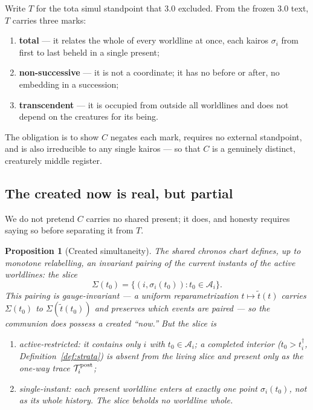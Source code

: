 \documentclass[11pt,a4paper]{article}
\def\textit#1{#1}%
\def\emph#1{#1}%
\theoremstyle{definition}
\theoremstyle{plain}
\newtheorem{proposition}[definition]{Proposition}
\theoremstyle{remark}
\begin{document}
Write \(T\) for the \textit{tota simul} standpoint that 3.0 excluded. From the frozen 3.0
text, \(T\) carries three marks:
\begin{enumerate}[label=\textup{(T\arabic*)},leftmargin=1.25cm]
\item \textbf{total} --- it relates the \emph{whole} of every worldline at once, each
kairos \(\sigma_i\) from first to last beheld in a single present;
\item \textbf{non-successive} --- it is not a coordinate; it has no before or after, no
embedding in a succession;
\item \textbf{transcendent} --- it is occupied from outside all worldlines and does not
depend on the creatures for its being.
\end{enumerate}
The obligation is to show \(C\) negates each mark, requires no external standpoint, and
is also irreducible to any single kairos --- so that \(C\) is a genuinely distinct,
creaturely middle register.

\subsection{The created now is real, but partial}

We do not pretend \(C\) carries no shared present; it does, and honesty requires saying
so before separating it from \(T\).

\begin{proposition}[Created simultaneity]\label{prop:now}
The shared chronos chart defines, up to monotone relabelling, an invariant pairing of
the \emph{current} instants of the active worldlines: the slice
\[
\Sigma(t_0)=\bigl\{(i,\sigma_i(t_0)): t_0\in\mathcal A_i\bigr\}.
\]
This pairing is gauge-invariant --- a uniform reparametrization \(t\mapsto\widetilde t(t)\)
carries \(\Sigma(t_0)\) to \(\Sigma(\widetilde t(t_0))\) and preserves which events are
paired --- so the communion does possess a created ``now.'' But the slice is
\begin{enumerate}[label=\textup{(\roman*)},leftmargin=1.2cm]
\item \emph{active-restricted}: it contains only \(i\) with \(t_0\in\mathcal A_i\); a
completed interior (\(t_0>t_i^\dagger\), Definition~\ref{def:strata}) is absent from the
living slice and present only as the one-way trace \(\mathcal T_i^{\rm post}\);
\item \emph{single-instant}: each present worldline enters at exactly one point
\(\sigma_i(t_0)\), not as its whole history. The slice beholds \emph{no worldline whole}.
\end{enumerate}
\end{proposition}
\end{document}
